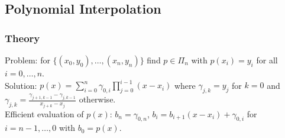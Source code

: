\documentclass[9pt]{article}   	%
\begin{document}
\subsection{Polynomial Interpolation}
\subsubsection{Theory}
Problem: for $\{(x_0,y_0),\ldots, (x_n, y_n) \}$ find $p \in \Pi_{n}$ with $p(x_i) = y_i$ for all $i=0,\ldots,n$.\\
Solution: $p(x) = \sum\limits_{i=0}^n \gamma_{0,i} \prod\limits_{j=0}^{i-1} (x-x_i)$ where $\gamma_{j,k} = y_j$ for $k = 0$ and $\gamma_{j,k} = \frac { \gamma_{j+1,k-1} - \gamma_{j,k-1} }{x_{j+k}-x_j}$ otherwise. \\
Efficient evaluation of $p(x)$: $b_n = \gamma_{0,n}$, $b_i = b_{i+1}(x-x_i) + \gamma_{0,i}$ for $i=n-1,\ldots,0$ with $b_0 = p(x)$. \\
\end{document}
